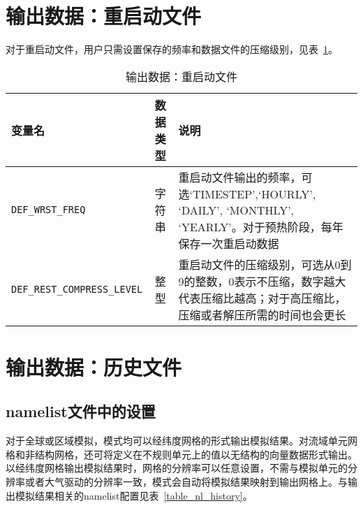 \section{输出数据：重启动文件}\label{restart}
对于重启动文件，用户只需设置保存的频率和数据文件的压缩级别，见表~\ref{table_nl_restart}。
\begin{table}[!htbp] \small
\caption{输出数据：重启动文件}\label{table_nl_restart}
\centering \renewcommand{\arraystretch}{1.2}
\begin{tabular}{lcp{}}
\toprule
\textbf{变量名} & \textbf{数据类型} & \textbf{说明} \\\midrule
\texttt{DEF\_WRST\_FREQ} & 字符串 & 重启动文件输出的频率，可选`TIMESTEP',`HOURLY', `DAILY', `MONTHLY', `YEARLY'。对于预热阶段，每年保存一次重启动数据 \\
\texttt{DEF\_REST\_COMPRESS\_LEVEL} & 整型 & 重启动文件的压缩级别，可选从0到9的整数，0表示不压缩，数字越大代表压缩比越高；对于高压缩比，压缩或者解压所需的时间也会更长 \\
\bottomrule
\end{tabular}
\end{table}

\section{输出数据：历史文件}\label{history}

\subsection{namelist文件中的设置}

对于全球或区域模拟，模式均可以经纬度网格的形式输出模拟结果。对流域单元网格和非结构网格，还可将定义在不规则单元上的值以无结构的向量数据形式输出。以经纬度网格输出模拟结果时，网格的分辨率可以任意设置，不需与模拟单元的分辨率或者大气驱动的分辨率一致，模式会自动将模拟结果映射到输出网格上。与输出模拟结果相关的namelist配置见表~\ref{table_nl_history}。

